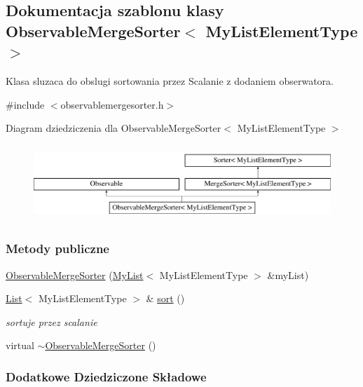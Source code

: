 \hypertarget{class_observable_merge_sorter}{\subsection{Dokumentacja szablonu klasy Observable\-Merge\-Sorter$<$ My\-List\-Element\-Type $>$}
\label{class_observable_merge_sorter}
}


Klasa sluzaca do obslugi sortowania przez Scalanie z dodaniem obserwatora.  




{\ttfamily \#include $<$observablemergesorter.\-h$>$}

Diagram dziedziczenia dla Observable\-Merge\-Sorter$<$ My\-List\-Element\-Type $>$\begin{figure}[H]
\begin{center}
\leavevmode
\includegraphics[height=2.886598cm]{class_observable_merge_sorter}
\end{center}
\end{figure}
\subsubsection*{Metody publiczne}
\begin{DoxyCompactItemize}
\item 
\hyperlink{class_observable_merge_sorter_af447c85bc1fcafd2d1e191968155023a}{Observable\-Merge\-Sorter} (\hyperlink{class_my_list}{My\-List}$<$ My\-List\-Element\-Type $>$ \&my\-List)
\item 
\hyperlink{class_list}{List}$<$ My\-List\-Element\-Type $>$ \& \hyperlink{class_observable_merge_sorter_ac845eed6758733f3935ffb5aa0b5f64a}{sort} ()
\begin{DoxyCompactList}\small\item\em sortuje przez scalanie \end{DoxyCompactList}\item 
virtual \hyperlink{class_observable_merge_sorter_a7d3a5f7257974ace9094cff9d499df99}{$\sim$\-Observable\-Merge\-Sorter} ()
\end{DoxyCompactItemize}
\subsubsection*{Dodatkowe Dziedziczone Składowe}


